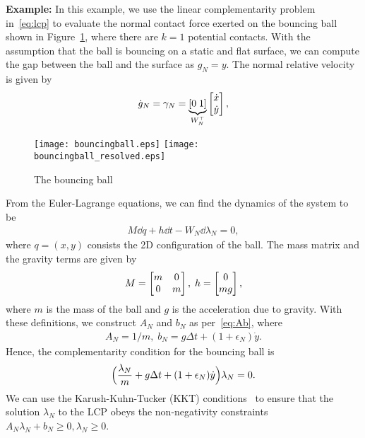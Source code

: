 \textbf{Example:} In this example, we use the linear complementarity problem
in~\eqref{eq:lcp} to evaluate the normal contact force exerted on the bouncing
ball shown in Figure~\ref{fig:bouncing_ball_sketch}, where there are $k=1$
potential contacts. 
%
With the assumption that the ball is bouncing on a static and flat surface, we can compute 
the gap between the ball and the surface as $g_N = y$.
%
The normal relative velocity is given by
\begin{align*}
  \dot{g}_N = \gamma_N = \underbrace{[0 \; 1]}_{W_N^\top} \begin{bmatrix}\dot{x} \\ \dot{y}\end{bmatrix},
\end{align*} 
%
\begin{figure}[tb]
  \centering
  \texttt{[image: bouncingball.eps]}\hfill
  \texttt{[image: bouncingball\_resolved.eps]}
  \caption{The bouncing ball}
  \label{fig:bouncing_ball_sketch}
\end{figure}

From the Euler-Lagrange equations, we can find the dynamics of the system to be 
\begin{align*}
  M \dd q + h \dd t - W_N \dd \lambda_N  = 0,
\end{align*}
\noindent where $q = (x,y)$ consists the 2D configuration of the ball. The mass
matrix and the gravity terms are given by  
\begin{align*}
  M = \begin{bmatrix}m & 0 \\ 0 & m\end{bmatrix}, \; h = \begin{bmatrix}0 \\ mg\end{bmatrix},
\end{align*}
\noindent where $m$ is the mass of the ball and $g$ is the acceleration due to
gravity.
%
With these definitions, we construct $A_N$ and $b_N$ as per~\eqref{eq:Ab}, where
\begin{align*} 
  A_N = 1/m, \;
  b_N = g \Delta t + (1+\epsilon_N)\dot{y}.
\end{align*}
Hence, the complementarity condition for the bouncing ball is
\begin{align*}
  \Bigl(\frac{\lambda_N}{m} + g \Delta t + (1+\epsilon_N)\dot{y}\Bigr)\lambda_N = 0.
\end{align*} 
%
We can use the Karush-Kuhn-Tucker (KKT) conditions~\cite{hu2012linear} to ensure
that the solution $\lambda_N$ to the LCP obeys the non-negativity constraints
$A_N \lambda_N + b_N \geq 0, \lambda_N \geq 0$.



